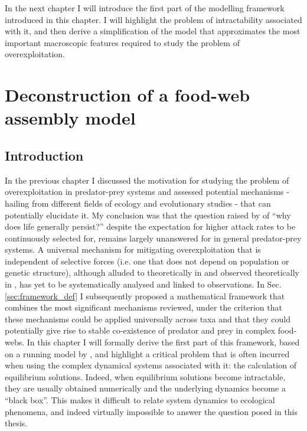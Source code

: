 \documentclass[a4paper]{report}
\begin{document}
In the next chapter I will introduce the first part of the modelling framework introduced in this chapter. I will highlight the problem of intractability associated with it, and then derive a simplification of the model that approximates the most important macroscopic features required to study the problem of overexploitation. 

\chapter{Deconstruction of a food-web assembly model \label{ch:chapter_2}}

\section{Introduction}

In the previous chapter I discussed the motivation for studying the problem of overexploitation in predator-prey systems and assessed potential mechanisms - hailing from different fields of ecology and evolutionary studies - that can potentially elucidate it. My conclusion was that the question raised by \citep{Parvivnen2013} of ``why does life generally persist?'' despite the expectation for higher attack rates to be continuously selected for, remains largely unanswered for in general predator-prey systems. A universal mechanism for mitigating overexploitation that is independent of selective forces (i.e. one that does not depend on population or genetic structure), although alluded to theoretically in \citep{Goodnight2008} and observed theoretically in \citep{Rossberg2008}, has yet to be systematically analysed and linked to observations. In Sec. \ref{sec:framework_def} I subsequently proposed a mathematical framework that combines the most significant mechanisms reviewed, under the criterion that these mechanisms could be applied universally across taxa and that they could potentially give rise to stable co-existence of predator and prey in complex food-webs. In this chapter I will formally derive the first part of this framework, based on a running model by \citep{Rossberg2013}, and highlight a critical problem that is often incurred when using the complex dynamical systems associated with it: the calculation of equilibrium solutions. Indeed, when equilibrium solutions become intractable, they are usually obtained numerically and the underlying dynamics become a ``black box''. This makes it difficult to relate system dynamics to ecological phenomena, and indeed virtually impossible to answer the question posed in this thesis.\\
\end{document}
